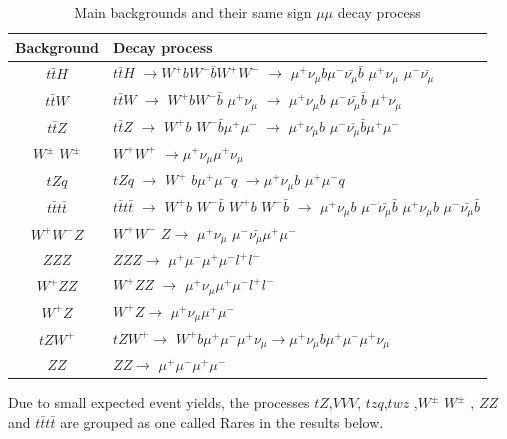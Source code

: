 \begin{table}
	\caption{Main backgrounds and their same sign $\mu\mu$ decay process }
	\centering
	\begin{tabular}{|c|l|}
		\hline
		Background &  Decay process \\
		\hline
		$t\bar{t}H$	& $t\bar{t}H$ $\rightarrow W^+b W^- \bar{b} W^+W^-$ $\rightarrow$ $\mu^+ \nu_\mu b$$\mu^- \bar{\nu_\mu}\bar{b}$ $\mu^+\nu_\mu$ $\mu^-\bar{\nu_\mu}$\\
		\hline  
		$t\bar{t}W$  &$t\bar{t}W$  $\rightarrow$  $W^+ b W^- \bar{b}$ $\mu^+\nu_\mu$ $\rightarrow$ $\mu^+ \nu_\mu b$ $\mu^- \bar{\nu_\mu} \bar{b}$ $\mu^+ \nu_\mu$\\
		\hline
		$t\bar{t} Z$ & $t\bar{t} Z$  $\rightarrow$ $W^+ b$  $W^-\bar{b} \mu^+ \mu^-$ $\rightarrow$ $\mu^+ \nu_\mu b$ $\mu^- \bar{\nu_\mu} \bar{b}\mu^+ \mu^-$  \\
		\hline 
		$W^\pm$ $W^\pm$  & $W^+W^+$ $\rightarrow$$\mu^+\nu_\mu$$\mu^+ {\nu_\mu}$ \\
		\hline 
		$tZq$  & $tZq$ $\rightarrow$ $W^+$ $ b\mu^+ \mu^- q$ $\rightarrow$$\mu^+ \nu_\mu b$ $\mu^+\mu^- q$ \\
		\hline 
		$t\bar{t}t\bar{t}$  &$t\bar{t}t\bar{t}$ $\rightarrow$ $W^+ b$   $W^- \bar{b}$  $W^+ b$  $W^- \bar{b}$   $\rightarrow$ $\mu^+ \nu_\mu b$ $\mu^- \bar{\nu_\mu} \bar{b}$ $\mu^+ \nu_\mu b$ $\mu^- \bar{\nu_\mu} \bar{b}$ \\
		\hline 
		$W^+ W^- Z$  &  $W^+ W^-$ $Z \rightarrow$ $\mu^+ \nu_\mu$ $\mu^- \bar{\nu_\mu} \mu^+ \mu^-$\\
		\hline 
		$ZZZ$  & $ZZZ \rightarrow$ $\mu^+ \mu^-\mu^+ \mu^-l^+ l^-$  \\
		\hline 
		$W^+ZZ$ &$W^+ZZ$ $\rightarrow$ $\mu^+ \nu_\mu \mu^+ \mu^- l^+l^-$ \\
		\hline 
		$W^+ Z$ &$W^+ Z \rightarrow$ $\mu^+ \nu_\mu \mu^+ \mu^-$ \\
		\hline
		$tZW^+$ & $tZW^+ \rightarrow$ $W^+b \mu^+ \mu^- \mu^+ \nu_\mu \rightarrow \mu^+ \nu_\mu b \mu^+ \mu^- \mu^+ \nu_\mu$\\
		\hline
		$ZZ$ &  $ZZ\rightarrow$ $\mu^+ \mu^- \mu^+ \mu^-$ \\
		\hline
	\end{tabular}
	\label{back}
\end{table} 
Due to small expected event yields, the processes $tZ$,$VVV$, $tzq$,$twz$ ,$W^\pm$ $W^\pm$ , $ZZ$ and $t\bar{t}t\bar{t}$ are grouped as one called Rares in the results below.
\pagebreak

